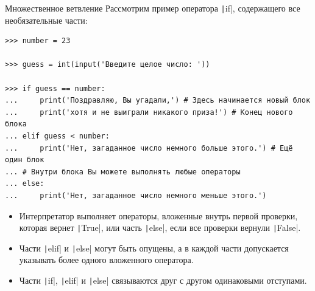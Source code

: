 \documentclass[aspectratio=169, mathserif]{beamer}	%
\begin{document}
\begin{frame}[fragile]{Множественное ветвление}
\scriptsize
Рассмотрим пример оператора \texttt|if|, содержащего все необязательные части:

\begin{verbatim}
>>> number = 23

>>> guess = int(input('Введите целое число: '))

>>> if guess == number:
...     print('Поздравляю, Вы угадали,') # Здесь начинается новый блок
...     print('хотя и не выиграли никакого приза!') # Конец нового блока
... elif guess < number:
...     print('Нет, загаданное число немного больше этого.') # Ещё один блок 
... # Внутри блока Вы можете выполнять любые операторы
... else:
...     print('Нет, загаданное число немного меньше этого.')
\end{verbatim}

\begin{itemize}
	\item  Интерпретатор выполняет операторы, вложенные внутрь первой проверки, которая вернет \texttt|True|, или часть \texttt|else|, если все проверки вернули \texttt|False|. 
	
	\item Части \texttt|elif| и \texttt|else| могут быть опущены, а в каждой части допускается указывать более одного вложенного оператора. 
	
	\item Части \texttt|if|, \texttt|elif| и \texttt|else| связываются друг с другом одинаковыми отступами.
\end{itemize}

\end{frame}


%	
%	
%	 
%
%
%    
%    
%
%
%
\end{document}
